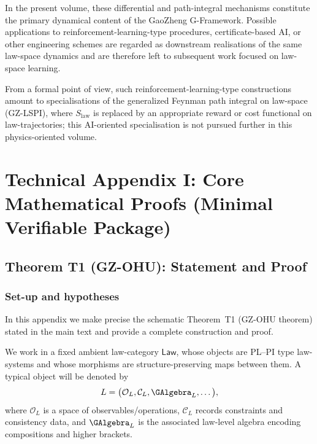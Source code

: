 \documentclass[11pt]{book}
\theoremstyle{plain}
\theoremstyle{definition}
\begin{document}
In the present volume, these differential and path-integral mechanisms
constitute the primary dynamical content of the GaoZheng G-Framework.
Possible applications to reinforcement-learning-type procedures,
certificate-based AI, or other engineering schemes are regarded as
downstream realisations of the same law-space dynamics and are therefore
left to subsequent work focused on law-space learning.

From a formal point of view, such reinforcement-learning-type
constructions amount to specialisations of the generalized Feynman path
integral on law-space (GZ-LSPI), where $S_{\mathrm{law}}$ is replaced
by an appropriate reward or cost functional on law-trajectories; this
AI-oriented specialisation is not pursued further in this
physics-oriented volume.




\appendix



\chapter{Technical Appendix I: Core Mathematical Proofs (Minimal Verifiable Package)}


\section{Theorem T1 (GZ-OHU): Statement and Proof}
\label{app:I-T1}

\subsection*{Set-up and hypotheses}


In this appendix we make precise the schematic Theorem~T1
(GZ-OHU theorem) stated in the main text and provide a complete
construction and proof.

We work in a fixed ambient law-category
\(\mathsf{Law}\), whose objects are PL--PI type law-systems and whose
morphisms are structure-preserving maps between them.  A typical object
will be denoted by
\[
  L = \bigl(\mathcal{O}_L, \mathcal{C}_L, \GAlgebra_L,\dots\bigr),
\]
where \(\mathcal{O}_L\) is a space of observables/operations,
\(\mathcal{C}_L\) records constraints and consistency data, and
\(\GAlgebra_L\) is the associated law-level algebra encoding
compositions and higher brackets.
\end{document}
